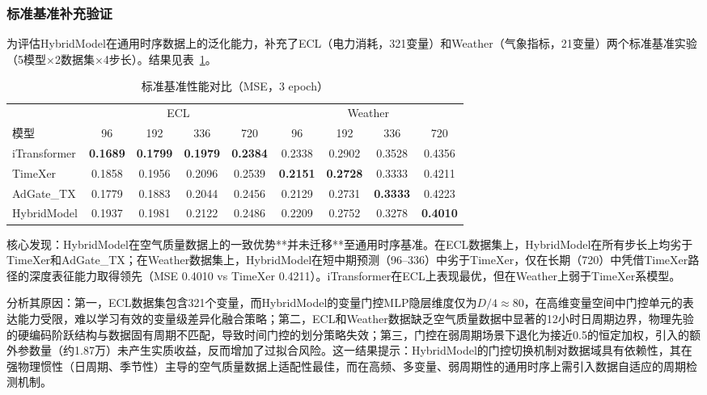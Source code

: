 \documentclass[12pt,a4paper]{article}
\begin{document}
\subsubsection{标准基准补充验证}

为评估HybridModel在通用时序数据上的泛化能力，补充了ECL（电力消耗，321变量）和Weather（气象指标，21变量）两个标准基准实验（5模型×2数据集×4步长）。结果见表~\ref{tab:standard}。

\begin{table}[H]
\centering
\caption{标准基准性能对比（MSE，3 epoch）}
\label{tab:standard}
\small
\begin{tabular}{l|cccc|cccc}
\toprule
& \multicolumn{4}{c|}{ECL} & \multicolumn{4}{c}{Weather} \\
模型 & 96 & 192 & 336 & 720 & 96 & 192 & 336 & 720 \\
\midrule
iTransformer & \textbf{0.1689} & \textbf{0.1799} & \textbf{0.1979} & \textbf{0.2384} & 0.2338 & 0.2902 & 0.3528 & 0.4356 \\
TimeXer & 0.1858 & 0.1956 & 0.2096 & 0.2539 & \textbf{0.2151} & \textbf{0.2728} & 0.3333 & 0.4211 \\
AdGate\_TX & 0.1779 & 0.1883 & 0.2044 & 0.2456 & 0.2129 & 0.2731 & \textbf{0.3333} & 0.4223 \\
HybridModel & 0.1937 & 0.1981 & 0.2122 & 0.2486 & 0.2209 & 0.2752 & 0.3278 & \textbf{0.4010} \\
\bottomrule
\end{tabular}
\end{table}

核心发现：HybridModel在空气质量数据上的一致优势**并未迁移**至通用时序基准。在ECL数据集上，HybridModel在所有步长上均劣于TimeXer和AdGate\_TX；在Weather数据集上，HybridModel在短中期预测（96--336）中劣于TimeXer，仅在长期（720）中凭借TimeXer路径的深度表征能力取得领先（MSE 0.4010 vs TimeXer 0.4211）。iTransformer在ECL上表现最优，但在Weather上弱于TimeXer系模型。

分析其原因：第一，ECL数据集包含321个变量，而HybridModel的变量门控MLP隐层维度仅为$D/4 \approx 80$，在高维变量空间中门控单元的表达能力受限，难以学习有效的变量级差异化融合策略；第二，ECL和Weather数据缺乏空气质量数据中显著的12小时日周期边界，物理先验的硬编码阶跃结构与数据固有周期不匹配，导致时间门控的划分策略失效；第三，门控在弱周期场景下退化为接近0.5的恒定加权，引入的额外参数量（约1.87万）未产生实质收益，反而增加了过拟合风险。这一结果提示：HybridModel的门控切换机制对数据域具有依赖性，其在强物理惯性（日周期、季节性）主导的空气质量数据上适配性最佳，而在高频、多变量、弱周期性的通用时序上需引入数据自适应的周期检测机制。
\end{document}
